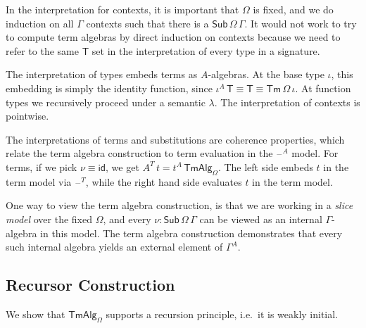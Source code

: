 \documentclass[12pt,a4paper,twoside,openany]{book}
\theoremstyle{remark}
\theoremstyle{definition}
\theoremstyle{theorem}
\newcommand{\ms}[1]{\mathsf{#1}}
\newcommand{\id}{\mathsf{id}}
\newcommand{\Sub}{\mathsf{Sub}}
\newcommand{\Tm}{\mathsf{Tm}}
\newcommand{\blank}{\mathord{\hspace{1pt}\text{--}\hspace{1pt}}}
\newcommand{\TmAlg}{\ms{TmAlg}}
\begin{document}
In the interpretation for contexts, it is important that $\Omega$ is
fixed, and we do induction on all $\Gamma$ contexts such that there is a
$\Sub\,\Omega\,\Gamma$. It would not work to try to compute term algebras by
direct induction on contexts because we need to refer to the same $\ms{T}$ set
in the interpretation of every type in a signature.

The interpretation of types embeds terms as $A$-algebras. At the base type
$\iota$, this embedding is simply the identity function, since $\iota^A\,\ms{T}
\equiv \ms{T} \equiv \Tm\,\Omega\,\iota$. At function types we recursively proceed
under a semantic $\lambda$. The interpretation of contexts is pointwise.

The interpretations of terms and substitutions are coherence properties, which
relate the term algebra construction to term evaluation in the $\blank^A$ model.
For terms, if we pick $\nu \equiv \id$, we get $A^T\,t =
t^A\,\TmAlg_{\Omega}$. The left side embeds $t$ in the term model via
$\blank^T$, while the right hand side evaluates $t$ in the term model.

One way to view the term algebra construction, is that we are working in a
\emph{slice model} over the fixed $\Omega$, and every $\nu :
\Sub\,\Omega\,\Gamma$ can be viewed as an internal $\Gamma$-algebra in this
model. The term algebra construction demonstrates that every such internal
algebra yields an external element of $\Gamma^A$.


\subsection{Recursor Construction}
\label{sec:simple-weak-initiality}
We show that $\TmAlg_{\Omega}$ supports a recursion principle, i.e.\ it is weakly
initial.
\end{document}
